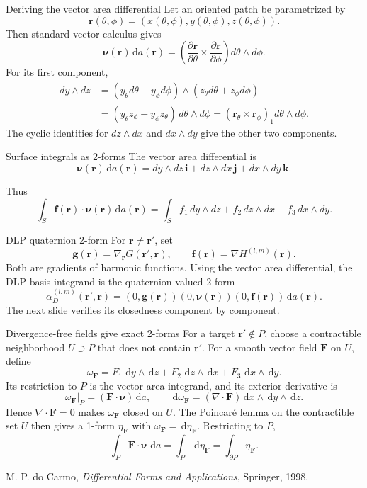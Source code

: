 \documentclass[aspectratio=169,11pt]{beamer}
\newcommand{\dd}{\,\mathrm d}
\newcommand{\rvec}{\bm{r}}
\newcommand{\rp}{\bm{r}'}
\newcommand{\nuvec}{\bm{\nu}}
\begin{document}
\begin{frame}{Deriving the vector area differential}
\small
Let an oriented patch be parametrized by
\[
  \rvec(\theta,\phi)=(x(\theta,\phi),y(\theta,\phi),z(\theta,\phi)).
\]
Then standard vector calculus gives
\[
  \nuvec(\rvec)\dd a(\rvec)
  =\left(\frac{\partial\rvec}{\partial\theta}
  \times\frac{\partial\rvec}{\partial\phi}\right)
  d\theta\wedge d\phi.
\]
For its first component,
\[
\begin{aligned}
  dy\wedge dz
  &=(y_\theta d\theta+y_\phi d\phi)
    \wedge(z_\theta d\theta+z_\phi d\phi)\\
  &=(y_\theta z_\phi-y_\phi z_\theta)\,d\theta\wedge d\phi
   =\left(\rvec_\theta\times\rvec_\phi\right)_1
     d\theta\wedge d\phi.
\end{aligned}
\]
The cyclic identities for $dz\wedge dx$ and $dx\wedge dy$ give the other
two components.
\end{frame}

\begin{frame}{Surface integrals as 2-forms}
\small
The vector area differential is
\[
  \nuvec(\rvec)\dd a(\rvec)
  =
  dy\wedge dz\,\mathbf i
  +dz\wedge dx\,\mathbf j
  +dx\wedge dy\,\mathbf k.
\]

Thus
\[
  \int_S \bm f(\rvec)\cdot\nuvec(\rvec)\dd a(\rvec)
  =
  \int_S f_1\,dy\wedge dz
  +f_2\,dz\wedge dx
  +f_3\,dx\wedge dy.
\]
\end{frame}

\begin{frame}{DLP quaternion 2-form}
\small
For $\rvec\ne\rp$, set
\[
  \bm g(\rvec)=\nabla_{\rvec}G(\rp,\rvec),
  \qquad
  \bm f(\rvec)=\nabla H^{(l,m)}(\rvec).
\]
Both are gradients of harmonic functions. Using the vector area differential,
the DLP basis integrand is the quaternion-valued 2-form
\[
  \alpha_D^{(l,m)}(\rp,\rvec)
  =(0,\bm g(\rvec))(0,\nuvec(\rvec))(0,\bm f(\rvec))\dd a(\rvec).
\]
The next slide verifies its closedness component by component.
\end{frame}

\begin{frame}{Divergence-free fields give exact 2-forms}
\small
For a target $\rp\notin P$, choose a contractible neighborhood $U\supset P$
that does not contain $\rp$. For a smooth vector field $\bm F$ on $U$, define
\[
  \omega_{\bm F}
  =F_1\,\dd y\wedge\dd z+F_2\,\dd z\wedge\dd x+F_3\,\dd x\wedge\dd y.
\]
Its restriction to $P$ is the vector-area integrand, and its exterior derivative is
\[
  \omega_{\bm F}|_P=(\bm F\cdot\nuvec)\dd a,
  \qquad
  \dd\omega_{\bm F}=(\nabla\cdot\bm F)\dd x\wedge\dd y\wedge\dd z.
\]
Hence $\nabla\cdot\bm F=0$ makes $\omega_{\bm F}$ closed on $U$.
The Poincar\'{e} lemma on the contractible set $U$ then gives a 1-form
$\eta_{\bm F}$ with $\omega_{\bm F}=\dd\eta_{\bm F}$. Restricting to $P$,
\[
  \int_P \bm F\cdot\nuvec\,\dd a
  =\int_P \dd\eta_{\bm F}
  =\int_{\partial P}\eta_{\bm F}.
\]

\footnotesize M. P. do Carmo, \emph{Differential Forms and Applications}, Springer, 1998.
\end{frame}
\end{document}
